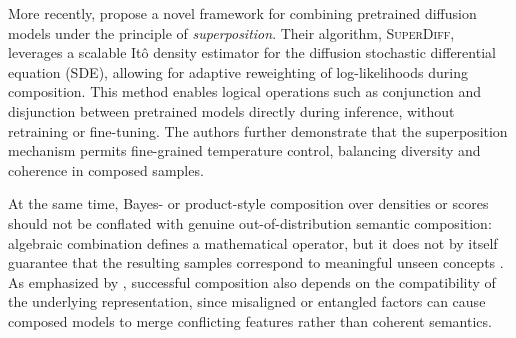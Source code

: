 
More recently, \citet{skreta2024superposition} propose a novel framework for combining pretrained diffusion models under the principle of \emph{superposition}.  
Their algorithm, \textsc{SuperDiff}, leverages a scalable Itô density estimator for the diffusion stochastic differential equation (SDE), allowing for adaptive reweighting of log-likelihoods during composition.  
This method enables logical operations such as conjunction and disjunction between pretrained models directly during inference, without retraining or fine-tuning.  
The authors further demonstrate that the superposition mechanism permits fine-grained temperature control, balancing diversity and coherence in composed samples.  

At the same time, Bayes- or product-style composition over densities or scores should not be conflated with genuine out-of-distribution semantic composition: algebraic combination defines a mathematical operator, but it does not by itself guarantee that the resulting samples correspond to meaningful unseen concepts \citep{du2024compositional}.  As emphasized by \citet{du2023reduce,du2024compositional}, successful composition also depends on the compatibility of the underlying representation, since misaligned or entangled factors can cause composed models to merge conflicting features rather than coherent semantics.


